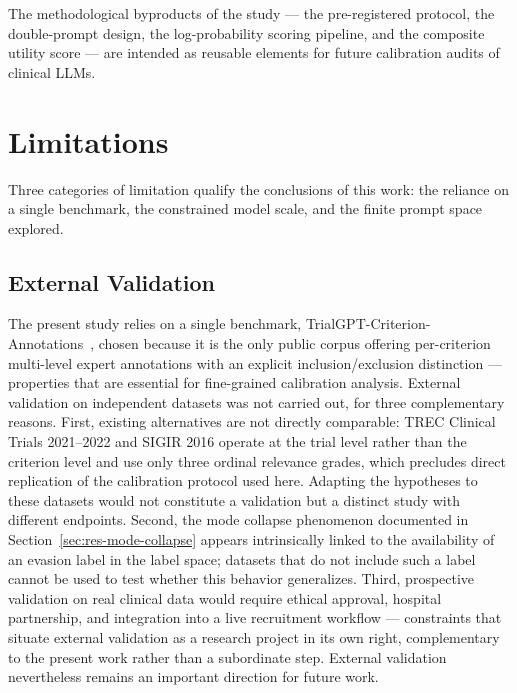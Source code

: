 The methodological byproducts of the study --- the pre-registered 
protocol, the double-prompt design, the log-probability scoring 
pipeline, and the composite utility score --- are intended as 
reusable elements for future calibration audits of clinical LLMs.

\section{Limitations}
\label{sec:conc-limitations}

Three categories of limitation qualify the conclusions of this work: 
the reliance on a single benchmark, the constrained model scale, and 
the finite prompt space explored.

\subsection{External Validation}
\label{subsec:conc-limitations-external}

The present study relies on a single benchmark, 
TrialGPT-Criterion-Annotations~\cite{jin2024trialgpt}, chosen because 
it is the only public corpus offering per-criterion multi-level expert 
annotations with an explicit inclusion/exclusion distinction --- 
properties that are essential for fine-grained calibration analysis. 
External validation on independent datasets was not carried out, for 
three complementary reasons. First, existing alternatives are not 
directly comparable: TREC Clinical Trials 2021--2022 and SIGIR 2016 
operate at the trial level rather than the criterion level and use 
only three ordinal relevance grades, which precludes direct 
replication of the calibration protocol used here. Adapting the 
hypotheses to these datasets would not constitute a validation but a 
distinct study with different endpoints. Second, the mode collapse 
phenomenon documented in Section~\ref{sec:res-mode-collapse} appears 
intrinsically linked to the availability of an evasion label in the 
label space; datasets that do not include such a label cannot be used 
to test whether this behavior generalizes. Third, prospective 
validation on real clinical data would require ethical approval, 
hospital partnership, and integration into a live recruitment 
workflow --- constraints that situate external validation as a 
research project in its own right, complementary to the present work 
rather than a subordinate step. External validation nevertheless 
remains an important direction for future work.

